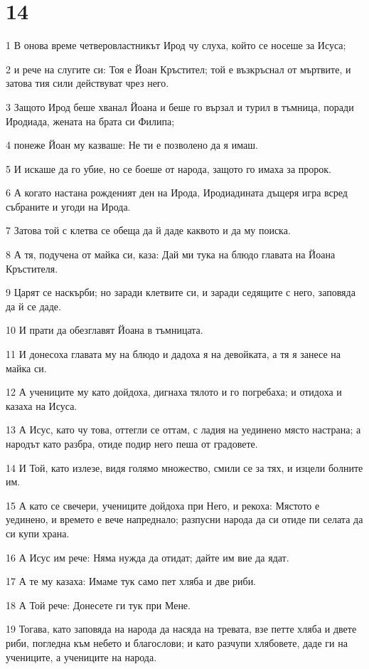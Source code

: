 \chapter{14}

\par 1 В онова време четверовластникът Ирод чу слуха, който се носеше за Исуса;
\par 2 и рече на слугите си: Тоя е Йоан Кръстител; той е възкръснал от мъртвите, и затова тия сили действуват чрез него.
\par 3 Защото Ирод беше хванал Йоана и беше го вързал и турил в тъмница, поради Иродиада, жената на брата си Филипа;
\par 4 понеже Йоан му казваше: Не ти е позволено да я имаш.
\par 5 И искаше да го убие, но се боеше от народа, защото го имаха за пророк.
\par 6 А когато настана рожденият ден на Ирода, Иродиадината дъщеря игра всред събраните и угоди на Ирода.
\par 7 Затова той с клетва се обеща да й даде каквото и да му поиска.
\par 8 А тя, подучена от майка си, каза: Дай ми тука на блюдо главата на Йоана Кръстителя.
\par 9 Царят се наскърби; но заради клетвите си, и заради седящите с него, заповяда да й се даде.
\par 10 И прати да обезглавят Йоана в тъмницата.
\par 11 И донесоха главата му на блюдо и дадоха я на девойката, а тя я занесе на майка си.
\par 12 А учениците му като дойдоха, дигнаха тялото и го погребаха; и отидоха и казаха на Исуса.
\par 13 А Исус, като чу това, оттегли се оттам, с ладия на уединено място настрана; а народът като разбра, отиде подир него пеша от градовете.
\par 14 И Той, като излезе, видя голямо множество, смили се за тях, и изцели болните им.
\par 15 А като се свечери, учениците дойдоха при Него, и рекоха: Мястото е уединено, и времето е вече напреднало; разпусни народа да си отиде пи селата да си купи храна.
\par 16 А Исус им рече: Няма нужда да отидат; дайте им вие да ядат.
\par 17 А те му казаха: Имаме тук само пет хляба и две риби.
\par 18 А Той рече: Донесете ги тук при Мене.
\par 19 Тогава, като заповяда на народа да насяда на тревата, взе петте хляба и двете риби, погледна към небето и благослови; и като разчупи хлябовете, даде ги на учениците, а учениците на народа.
